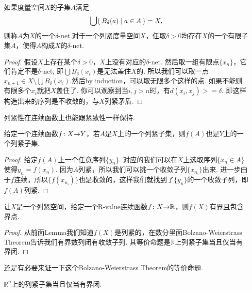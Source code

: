 \begin{lemma}[Lebesgue引理]
如果度量空间$X$的子集$A$满足\[\bigcup\{\,B_\delta(a)\mid a\in A\,\} =X,\]则称$A$为$X$的一个$\delta$-net.对于一个列紧度量空间$X$，任取$\delta > 0$均存在$X$的一个有限子集$A$，使得$A$构成$X$的$\delta$-net.
\end{lemma}

\begin{proof}
假设$X$上存在某个$\delta>0$，$X$上没有对应的$\delta$-net. 然后取一组有限点$\{x_n\}$，它们肯定不是$\delta$-net, 即$\bigcup B_\delta(x_i)$是无法盖住$X$的. 所以我们可以取一点$x_{n+1} \in X \setminus \bigcup B_\delta(x_i)$.然后by induction，可以取无限多个这样的点. 如果不能则有限多个$x_i$就把$X$盖住了. 你可以观察到当$i,j > n$时，有$d(x_i,x_j) >= \delta$. 即这样构造出来的序列是不收敛的，与$X$列紧矛盾.  
\end{proof}

列紧性在连续函数上也能跟紧致性一样保持.
\begin{lemma}
给定一个连续函数${f}\colon{X}{\to}{Y}$，若$A$是$X$上的一个列紧子集，则$f(A)$也是$Y$上的一个列紧子集.
\end{lemma}

\begin{proof}
给定$f(A)$上一个任意序列$\{y_n\}$. 对应的我们可以在$X$上选取序列$\{x_n \in A\}$使得$y_n = f(x_n)$. 因为$A$列紧，所以我们可以挑一个收敛子列$\{x_{n_i}\}$出来. 进一步由于$f$连续，所以$\{f(x_{n_i})\}$也是收敛的，这样我们就找到了$\{y_n\}$的一个收敛子列，即$f(A)$列紧.
\end{proof}

\begin{lemma}
让$X$是一个列紧空间，给定一个R-value连续函数${f}\colon{X}{\to}{\mathbb{R}}$，则$f(X)$有界且包含界点.
\end{lemma}

\begin{proof}
从前面Lemma我们知道$f(X)$是列紧的，在数分里面Bolzano-Weierstrass Theorem告诉我们有界数列闭有收敛子列. 其等价命题是$\mathbb{R}$上列紧子集当且仅当有界闭.
\end{proof}

还是有必要来证一下这个Bolzano-Weierstrass Theorem的等价命题.

\begin{theorem}
$\mathbb{R}^{n}$上的列紧子集当且仅当有界闭.
\end{theorem} 

